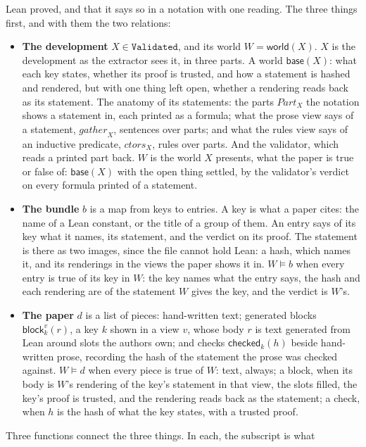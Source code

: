 \documentclass[acmsmall,screen,review,anonymous,nonacm]{acmart}
\begin{document}
Lean proved, and that it says so in a notation with one reading. The three
things first, and with them the two relations:
\begin{itemize}
\item \textbf{The development} $X \in \texttt{Validated}$, and its world
  $W = \mathsf{world}(X)$. $X$ is the development as the extractor sees it,
  in three parts. A world $\mathsf{base}(X)$: what each key states, whether
  its proof is trusted, and how a statement is hashed and rendered, but
  with one thing left open, whether a rendering reads back as its
  statement. The anatomy of its statements: the parts $\mathit{Part}_{X}$
  the notation shows a statement in, each printed as a formula; what the
  prose view says of a statement, $\mathit{gather}_{X}$, sentences over
  parts; and what the rules view says of an inductive predicate,
  $\mathit{ctors}_{X}$, rules over parts. And the validator, which reads a
  printed part back. $W$ is the world $X$ presents, what the paper is true
  or false of: $\mathsf{base}(X)$ with the open thing settled, by the
  validator's verdict on every formula printed of a statement.
\item \textbf{The bundle} $b$ is a map from keys to entries. A key is
  what a paper cites: the name of a Lean constant, or the title of a group
  of them. An entry says of its key what it names, its statement, and the
  verdict on its proof. The statement is there as two images, since the
  file cannot hold Lean: a hash, which names it, and its renderings in the
  views the paper shows it in. $W \models b$ when every entry is true of
  its key in $W$: the key names what the entry says, the hash and each
  rendering are of the statement $W$ gives the key, and the verdict is
  $W$'s.
\item \textbf{The paper} $d$ is a list of pieces: hand-written text;
  generated blocks $\mathsf{block}_{k}^{v}(r)$, a key $k$ shown in a view
  $v$, whose body $r$ is text generated from Lean around slots the authors
  own; and checks $\mathsf{checked}_{k}(h)$ beside hand-written prose,
  recording the hash of the statement the prose was checked against.
  $W \models d$ when every piece is true of $W$: text, always; a block,
  when its body is $W$'s rendering of the key's statement in that view,
  the slots filled, the key's proof is trusted, and the rendering reads
  back as the statement; a check, when $h$ is the hash of what the key
  states, with a trusted proof.
\end{itemize}
Three functions connect the three things. In each, the subscript is what
\end{document}
